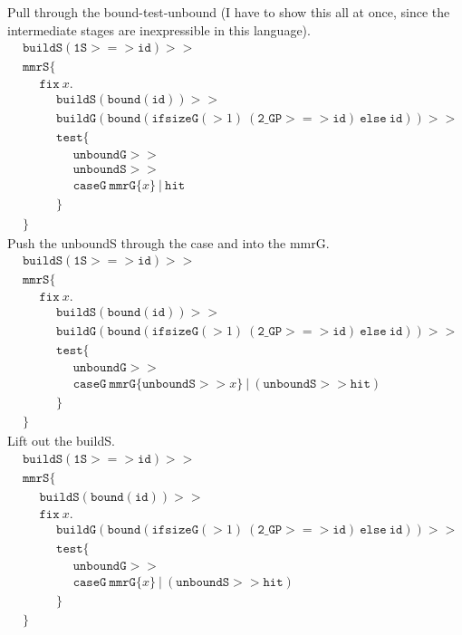 \documentclass{article}
\newcommand {\fix}{\mathtt{fix}}
\newcommand {\test}{\mathtt{test}}
\newcommand {\isect}{\mathtt{hit}}
\newcommand {\buildG}{\mathtt{buildG}}
\newcommand {\buildS}{\mathtt{buildS}}
\newcommand {\id}{\mathtt{id}}
\newcommand {\unboundG}{\mathtt{unboundG}}
\newcommand {\unboundS}{\mathtt{unboundS}}
\newcommand {\mmrG}{\mathtt{mmrG}}
\newcommand {\mmrS}{\mathtt{mmrS}}
\newcommand {\oneS}{\mathtt{1S}}
\newcommand {\twoGP}{\mathtt{2\_GP}}
\newcommand {\bound}{\mathtt{bound}}
\newcommand {\tab}{~~~~~~}
\begin{document}
Pull through the bound-test-unbound (I have to show this all at once, since the intermediate stages are inexpressible in this language).
\begin{align*}
&\buildS (\oneS >=> \id) >> \\
&\mmrS \{ \\
&\tab\fix~x. \\
&\tab\tab \buildS(\bound (\mathtt{id})) >> \\
&\tab\tab \buildG (\bound(\mathtt{ifsizeG}(>1)~(\twoGP >=> \id)~\mathtt{else}~\id)) >> \\
&\tab\tab\test \{ \\
&\tab\tab\tab \unboundG >> \\
&\tab\tab\tab \unboundS >> \\
&\tab\tab\tab \mathtt{caseG}~\mmrG \{x\}~|~\isect\\
&\tab \tab \} \\
&\}
\end{align*}
Push the unboundS through the case and into the mmrG.
\begin{align*}
&\buildS (\oneS >=> \id) >> \\
&\mmrS \{ \\
&\tab\fix~x. \\
&\tab\tab \buildS(\bound (\mathtt{id})) >> \\
&\tab\tab \buildG (\bound(\mathtt{ifsizeG}(>1)~(\twoGP >=> \id)~\mathtt{else}~\id)) >> \\
&\tab\tab\test \{ \\
&\tab\tab\tab \unboundG >> \\
&\tab\tab\tab \mathtt{caseG}~\mmrG \{\unboundS >> x\}~|~(\unboundS >> \isect)\\
&\tab \tab \} \\
&\}
\end{align*}
Lift out the buildS.
\begin{align*}
&\buildS (\oneS >=> \id) >> \\
&\mmrS \{ \\
&\tab \buildS(\bound (\mathtt{id})) >> \\
&\tab\fix~x. \\
&\tab\tab \buildG (\bound(\mathtt{ifsizeG}(>1)~(\twoGP >=> \id)~\mathtt{else}~\id)) >> \\
&\tab\tab\test \{ \\
&\tab\tab\tab \unboundG >> \\
&\tab\tab\tab \mathtt{caseG}~\mmrG \{x\}~|~(\unboundS >> \isect)\\
&\tab \tab \} \\
&\}
\end{align*}
\end{document}
